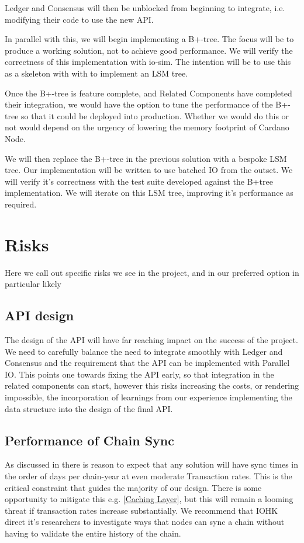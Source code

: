 \documentclass[11pt,a4paper]{article}
\begin{document}
Ledger and Consensus will then be unblocked from beginning to integrate, i.e.
modifying their code to use the new API.

In parallel with this, we will begin implementing a B+-tree. The focus will
be to produce a working solution, not to achieve good performance. We
will verify the correctness of this implementation with io-sim. The intention
will be to use this as a skeleton with with to implement an LSM tree.

Once the B+-tree is feature complete, and Related Components have completed
their integration, we would have the option to tune the performance of the
B+-tree so that it could be deployed into production. Whether we would do this
or not would depend on the urgency of lowering the memory footprint of Cardano
Node.

We will then replace the B+-tree in the previous solution with a bespoke LSM tree.
Our implementation will be written to use batched IO from the outset. We will
verify it's correctness with the test suite developed against the B+tree
implementation. We will iterate on this LSM tree, improving it's performance
as required.

\section{Risks}

Here we call out specific risks we see in the project, and in our preferred option in particular
likely

\subsection{API design}
The design of the API will have far reaching impact on the success of the
project. We need to carefully balance the need to integrate smoothly with Ledger
and Consensus and the requirement that the API can be implemented with Parallel
IO. This points one towards fixing the API early, so that integration in the
related components can start, however this risks increasing the costs, or
rendering impossible, the incorporation of learnings from our experience
implementing the data structure into the design of the final API.

\subsection{Performance of Chain Sync}
As discussed in  there is reason to expect that any solution
will have sync times in the order of days per chain-year at even moderate
Transaction rates. This is the critical constraint that guides the majority of
our design. There is some opportunity to mitigate this e.g. \ref{Caching Layer},
but this will remain a looming threat if transaction rates increase
substantially. We recommend that IOHK direct it's researchers to investigate
ways that nodes can sync a chain without having to validate the entire history
of the chain.



\end{document}
